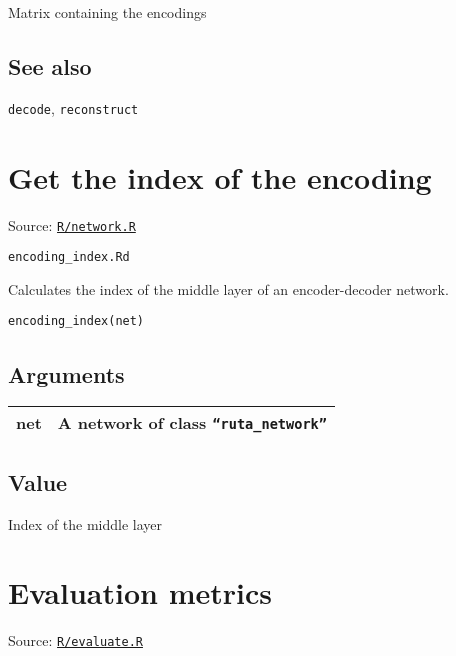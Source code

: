 Matrix containing the encodings

\hypertarget{see-also}{\subsection{\texorpdfstring{\protect\hyperlink{see-also}{}See
also}{See also}}\label{see-also}}

\texttt{decode}, \texttt{reconstruct}

\section{Get the index of the
encoding}\label{get-the-index-of-the-encoding}

Source:
\href{https://github.com/fdavidcl/ruta/blob/master/R/network.R}{\texttt{R/network.R}}

\texttt{encoding\_index.Rd}

Calculates the index of the middle layer of an encoder-decoder network.

\begin{verbatim}
encoding_index(net)
\end{verbatim}

\hypertarget{arguments}{\subsection{\texorpdfstring{\protect\hyperlink{arguments}{}Arguments}{Arguments}}\label{arguments}}

\begin{longtable}[c]{@{}>{\small}p{3cm}>{\raggedright}p{12.5cm}@{}}
\toprule
net & A network of class \texttt{``ruta\_network''}\tabularnewline
\bottomrule
\end{longtable}

\hypertarget{value}{\subsection{\texorpdfstring{\protect\hyperlink{value}{}Value}{Value}}\label{value}}

Index of the middle layer

\section{Evaluation metrics}\label{evaluation-metrics}

Source:
\href{https://github.com/fdavidcl/ruta/blob/master/R/evaluate.R}{\texttt{R/evaluate.R}}

